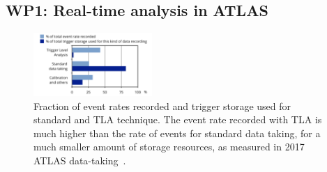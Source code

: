 \documentclass[11pt,a4paper]{article}
\begin{document}



\subsection*{WP1: Real-time analysis in ATLAS}

\begin{figure} \includegraphics[width=0.4\textwidth]{figs/TLAPEB}
\caption{\label{fig:TLAPEB} \small Fraction of event rates recorded and trigger storage used for standard and TLA technique. 
The event rate recorded with TLA is much higher than the rate of events for standard data taking, for a much smaller amount of storage resources, as measured in 2017 ATLAS data-taking~\cite{ATLASComputing}. \scriptsize }
\end{figure}
\end{document}
